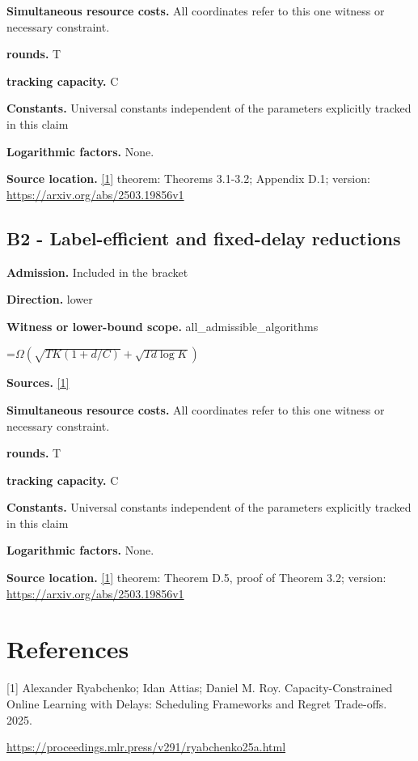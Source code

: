 \documentclass[10pt,a4paper]{article}
\newcommand{\AtlasMath}[1]{\par\begingroup\centering\setbox0=\hbox{$\displaystyle #1$}\ifdim\wd0>1.4\linewidth\typeout{ATLAS WIDE FORMULA: \the\wd0}\fi\ifdim\wd0>\linewidth\resizebox{\linewidth}{!}{\box0}\else\box0\fi\par\endgroup}
\begin{document}
\textbf{Simultaneous resource costs.} All coordinates refer to this one witness or necessary constraint.

\textbf{rounds.} T

\textbf{tracking capacity.} C

\textbf{Constants.} Universal constants independent of the parameters explicitly tracked in this claim

\textbf{Logarithmic factors.} None.

\textbf{Source location.} \href{https://proceedings.mlr.press/v291/ryabchenko25a.html}{[1]} theorem: Theorems 3.1-3.2; Appendix D.1; version: \url{https://arxiv.org/abs/2503.19856v1}

\subsection{B2 - Label-efficient and fixed-delay reductions}
\textbf{Admission.} Included in the bracket

\textbf{Direction.} lower

\textbf{Witness or lower-bound scope.} all\_admissible\_algorithms

\AtlasMath{\Omega\!\left(\sqrt{TK(1+d/C)}+\sqrt{Td\log K}\right)}
\textbf{Sources.} \href{https://proceedings.mlr.press/v291/ryabchenko25a.html}{[1]}

\textbf{Simultaneous resource costs.} All coordinates refer to this one witness or necessary constraint.

\textbf{rounds.} T

\textbf{tracking capacity.} C

\textbf{Constants.} Universal constants independent of the parameters explicitly tracked in this claim

\textbf{Logarithmic factors.} None.

\textbf{Source location.} \href{https://proceedings.mlr.press/v291/ryabchenko25a.html}{[1]} theorem: Theorem D.5, proof of Theorem 3.2; version: \url{https://arxiv.org/abs/2503.19856v1}

\section{References}
[1] Alexander Ryabchenko; Idan Attias; Daniel M. Roy. Capacity-Constrained Online Learning with Delays: Scheduling Frameworks and Regret Trade-offs. 2025.

\url{https://proceedings.mlr.press/v291/ryabchenko25a.html}
\end{document}
